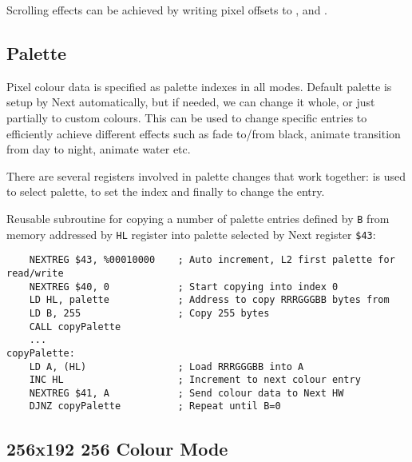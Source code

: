 Scrolling effects can be achieved by writing pixel offsets to ,  and .


\subsection{Palette}

Pixel colour data is specified as palette indexes in all modes. Default palette is setup by Next automatically, but if needed, we can change it whole, or just partially to custom colours. This can be used to change specific entries to efficiently achieve different effects such as fade to/from black, animate transition from day to night, animate water etc.

There are several registers involved in palette changes that work together:  is used to select palette,  to set the index and finally  to change the entry.

Reusable subroutine for copying a number of palette entries defined by {\tt B} from memory addressed by {\tt HL} register into palette selected by Next register {\tt \$43}:

\begin{lstlisting}
    NEXTREG $43, %00010000    ; Auto increment, L2 first palette for read/write
    NEXTREG $40, 0            ; Start copying into index 0
    LD HL, palette            ; Address to copy RRRGGGBB bytes from
    LD B, 255                 ; Copy 255 bytes
    CALL copyPalette
    ...
copyPalette:
    LD A, (HL)                ; Load RRRGGGBB into A
    INC HL                    ; Increment to next colour entry
    NEXTREG $41, A            ; Send colour data to Next HW
    DJNZ copyPalette          ; Repeat until B=0
\end{lstlisting}


\pagebreak
\subsection{256x192 256 Colour Mode}

